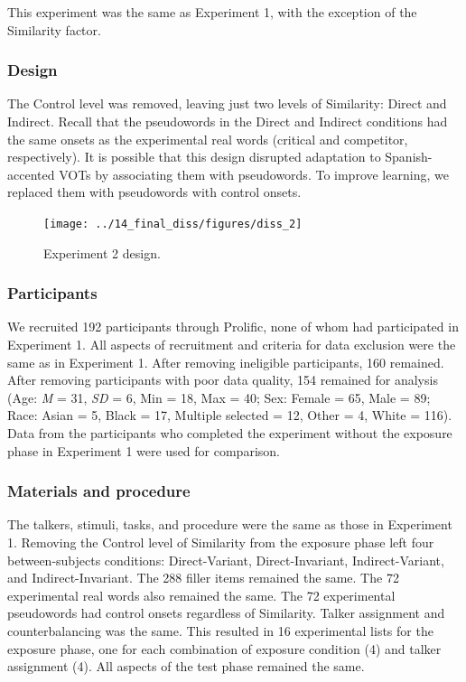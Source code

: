 \documentclass[preprint, 3p, authoryear]{elsarticle} %
\begin{document}
This experiment was the same as Experiment 1, with the exception of the Similarity factor.

\hypertarget{design}{%
\subsubsection{Design}\label{design}}

The Control level was removed, leaving just two levels of Similarity: Direct and Indirect.
Recall that the pseudowords in the Direct and Indirect conditions had the same onsets as the experimental real words (critical and competitor, respectively).
It is possible that this design disrupted adaptation to Spanish-accented VOTs by associating them with pseudowords.
To improve learning, we replaced them with pseudowords with control onsets.

\begin{figure}

{\centering \texttt{[image: ../14\_final\_diss/figures/diss\_2]} 

}

\caption{Experiment 2 design.}\label{fig:exp2-fig}
\end{figure}

\hypertarget{methods-pars-1b}{%
\subsubsection{Participants}\label{methods-pars-1b}}

We recruited 192 participants through Prolific, none of whom had participated in Experiment 1.
All aspects of recruitment and criteria for data exclusion were the same as in Experiment 1.
After removing ineligible participants, 160 remained.
After removing participants with poor data quality, 154 remained for analysis (Age: \emph{M} = 31, \emph{SD} = 6, Min = 18, Max = 40; Sex: Female = 65, Male = 89; Race: Asian = 5, Black = 17, Multiple selected = 12, Other = 4, White = 116).
Data from the participants who completed the experiment without the exposure phase in Experiment 1 were used for comparison.

\hypertarget{materials-and-procedure}{%
\subsubsection{Materials and procedure}\label{materials-and-procedure}}

The talkers, stimuli, tasks, and procedure were the same as those in Experiment 1.
Removing the Control level of Similarity from the exposure phase left four between-subjects conditions: Direct-Variant, Direct-Invariant, Indirect-Variant, and Indirect-Invariant.
The 288 filler items remained the same.
The 72 experimental real words also remained the same.
The 72 experimental pseudowords had control onsets regardless of Similarity.
Talker assignment and counterbalancing was the same.
This resulted in 16 experimental lists for the exposure phase, one for each combination of exposure condition (4) and talker assignment (4).
All aspects of the test phase remained the same.
\end{document}
